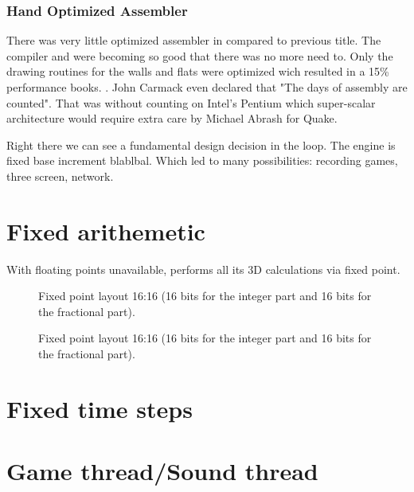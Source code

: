 \par


\subsubsection{Hand Optimized Assembler}
There was very little optimized assembler in \doom compared to previous title. The compiler and  were becoming so good that there was no more need to. Only the drawing routines for the walls and flats were optimized wich resulted in a 15\% performance books. . John Carmack even declared that "The days of assembly are counted". That was without counting on Intel's Pentium which super-scalar architecture would require extra care by Michael Abrash for Quake.



Right there we can see a fundamental design decision in the loop. The engine is fixed base increment blablbal. Which led to many possibilities: recording games, three screen, network.

\section{Fixed arithemetic}
With floating points unavailable, \doom performs all its 3D calculations via fixed point.\\
\par
{}

\begin{figure}[H]
 \centering
  
 \caption{Fixed point layout 16:16 (16 bits for the integer part and 16 bits for the fractional part).} \label{fig:mips}
\end{figure}

\begin{figure}[H]
 \centering
  
 \caption{Fixed point layout 16:16 (16 bits for the integer part and 16 bits for the fractional part).} \label{fig:mips}
\end{figure}

\section{Fixed time steps}

\section{Game thread/Sound thread}
